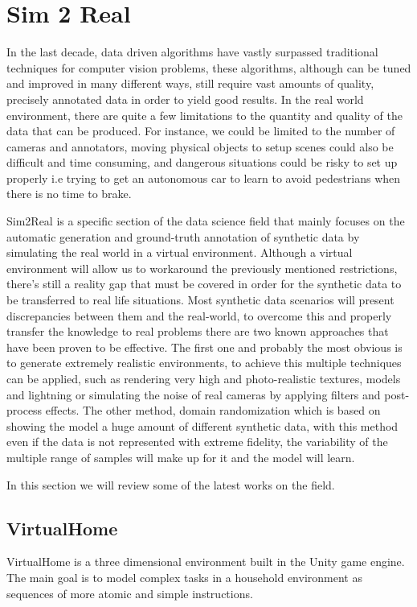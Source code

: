 \section{Sim 2 Real}
\label{sec:sim2real}
In the last decade, data driven algorithms have vastly surpassed traditional techniques for computer vision problems, these algorithms, although can be tuned and improved in many different ways, still require vast amounts of quality, precisely annotated data in order to yield good results. In the real world environment, there are quite a few limitations to the quantity and quality of the data that can be produced. For instance, we could be limited to the number of cameras and annotators, moving physical objects to setup scenes could also be difficult and time consuming, and dangerous situations could be risky to set up properly i.e trying to get an autonomous car to learn to avoid pedestrians when there is no time to brake.
    
Sim2Real is a specific section of the data science field that mainly focuses on the automatic generation and ground-truth annotation of synthetic data by simulating the real world in a virtual environment. Although a virtual environment will allow us to workaround the previously mentioned restrictions, there's still a reality gap that must be covered in order for the synthetic data to be transferred to real life situations. Most synthetic data scenarios will present discrepancies between them and the real-world, to overcome this and properly transfer the knowledge to real problems there are two known approaches that have been proven to be effective. The first one and probably the most obvious is to generate extremely realistic environments, to achieve this multiple techniques can be applied, such as rendering very high and photo-realistic textures, models and lightning or simulating the noise of real cameras by applying filters and post-process effects. The other method, domain randomization \cite{DBLP:journals/corr/TobinFRSZA17} which is based on showing the model a huge amount of different synthetic data, with this method even if the data is not represented with extreme fidelity, the variability of the multiple range of samples will make up for it and the model will learn.

In this section we will review some of the latest works on the field.

\subsection{VirtualHome}
VirtualHome is a three dimensional environment built in the Unity game engine. The main goal is to model complex tasks in a household environment as sequences of more atomic and simple instructions.
 
